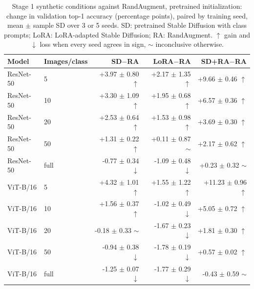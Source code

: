 \begin{table}[H]
\centering
\caption{Stage 1 synthetic conditions against RandAugment, pretrained initialization: change in validation top-1 accuracy (percentage points), paired by training seed, mean $\pm$ sample SD over 3 or 5 seeds. SD: pretrained Stable Diffusion with class prompts; LoRA: LoRA-adapted Stable Diffusion; RA: RandAugment. $\uparrow$ gain and $\downarrow$ loss when every seed agrees in sign, $\sim$ inconclusive otherwise.}
\label{tab:stage1-pretrained-accuracy-vs-randaugment}
\begin{tabular}{llrrr}
\toprule
Model & Images/class & SD$-$RA & LoRA$-$RA & SD+RA$-$RA \\
\midrule
ResNet-50 & 5 & +3.97 $\pm$ 0.80 $\uparrow$ & +2.17 $\pm$ 1.35 $\uparrow$ & +9.66 $\pm$ 0.46 $\uparrow$ \\
ResNet-50 & 10 & +3.30 $\pm$ 1.09 $\uparrow$ & +1.95 $\pm$ 0.68 $\uparrow$ & +6.57 $\pm$ 0.36 $\uparrow$ \\
ResNet-50 & 20 & +2.53 $\pm$ 0.64 $\uparrow$ & +1.53 $\pm$ 0.98 $\uparrow$ & +3.69 $\pm$ 0.30 $\uparrow$ \\
ResNet-50 & 50 & +1.31 $\pm$ 0.22 $\uparrow$ & +0.11 $\pm$ 0.87 $\sim$ & +2.17 $\pm$ 0.62 $\uparrow$ \\
ResNet-50 & full & -0.77 $\pm$ 0.34 $\downarrow$ & -1.09 $\pm$ 0.48 $\downarrow$ & +0.23 $\pm$ 0.32 $\sim$ \\
\midrule
ViT-B/16 & 5 & +4.32 $\pm$ 1.01 $\uparrow$ & +1.55 $\pm$ 1.22 $\uparrow$ & +11.23 $\pm$ 0.96 $\uparrow$ \\
ViT-B/16 & 10 & +1.56 $\pm$ 0.37 $\uparrow$ & -1.02 $\pm$ 0.49 $\downarrow$ & +5.05 $\pm$ 0.72 $\uparrow$ \\
ViT-B/16 & 20 & -0.18 $\pm$ 0.33 $\sim$ & -1.67 $\pm$ 0.23 $\downarrow$ & +1.81 $\pm$ 0.30 $\uparrow$ \\
ViT-B/16 & 50 & -0.94 $\pm$ 0.38 $\downarrow$ & -1.78 $\pm$ 0.19 $\downarrow$ & +0.57 $\pm$ 0.02 $\uparrow$ \\
ViT-B/16 & full & -1.25 $\pm$ 0.07 $\downarrow$ & -1.77 $\pm$ 0.29 $\downarrow$ & -0.43 $\pm$ 0.59 $\sim$ \\
\bottomrule
\end{tabular}
\end{table}
